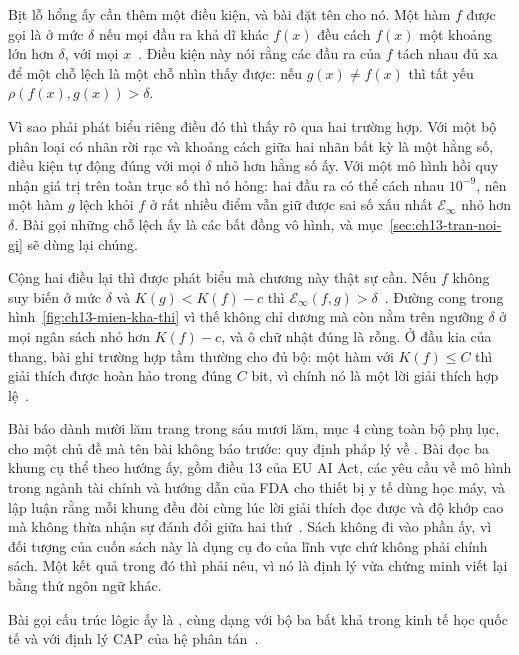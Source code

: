 %
Bịt lỗ hổng ấy cần thêm một điều kiện, và bài đặt tên cho nó. Một hàm $f$ được
gọi là  ở mức $\delta$ nếu mọi đầu ra khả dĩ
khác $f(x)$ đều cách $f(x)$ một khoảng lớn hơn $\delta$, với mọi
$x$~\autocite{p26limits}. Điều kiện này nói rằng các đầu ra của $f$ tách nhau đủ
xa để một chỗ lệch là một chỗ nhìn thấy được: nếu $g(x) \ne f(x)$ thì tất yếu
$\rho(f(x),g(x)) > \delta$.

Vì sao phải phát biểu riêng điều đó thì thấy rõ qua hai trường hợp. Với một bộ
phân loại có nhãn rời rạc và khoảng cách giữa hai nhãn bất kỳ là một hằng số,
điều kiện tự động đúng với mọi $\delta$ nhỏ hơn hằng số ấy. Với một mô hình hồi
quy nhận giá trị trên toàn trục số thì nó hỏng: hai đầu ra có thể cách nhau
$10^{-9}$, nên một hàm $g$ lệch khỏi $f$ ở rất nhiều điểm vẫn giữ được sai số
xấu nhất $\mathcal{E}_{\infty}$ nhỏ hơn $\delta$. Bài gọi những chỗ lệch ấy là các bất đồng vô hình,
và mục~\ref{sec:ch13-tran-noi-gi} sẽ dùng lại chúng.

Cộng hai điều lại thì được phát biểu mà chương này thật sự cần. Nếu $f$ không
suy biến ở mức $\delta$ và $K(g) < K(f) - c$ thì
$\mathcal{E}_{\infty}(f,g) > \delta$~\autocite{p26limits}. Đường cong trong
hình~\ref{fig:ch13-mien-kha-thi} vì thế không chỉ dương mà còn nằm trên ngưỡng
$\delta$ ở mọi ngân sách nhỏ hơn $K(f) - c$, và ô chữ nhật đúng là rỗng. Ở đầu
kia của thang, bài ghi trường hợp tầm thường cho đủ bộ: một hàm với
$K(f) \le C$ thì giải thích được hoàn hảo trong đúng $C$ bit, vì chính nó là một
lời giải thích hợp lệ~\autocite{p26limits}.

%
Bài báo dành mười lăm trang trong sáu mươi lăm, mục 4 cùng toàn bộ phụ lục, cho một chủ
đề mà tên bài không báo trước: quy định pháp lý về . Bài đọc
ba khung cụ thể theo hướng ấy, gồm điều 13 của EU AI Act, các yêu cầu về mô hình
trong ngành tài chính và hướng dẫn của FDA cho thiết bị y tế dùng học máy, và
lập luận rằng mỗi khung đều đòi cùng lúc lời giải thích đọc được và độ khớp cao
mà không thừa nhận sự đánh đổi giữa hai thứ~\autocite{p26limits}. Sách không đi
vào phần ấy, vì đối tượng của cuốn sách này là dụng cụ đo của lĩnh vực chứ không
phải chính sách. Một kết quả trong đó thì phải nêu, vì nó là định lý vừa chứng
minh viết lại bằng thứ ngôn ngữ khác.

Bài gọi cấu trúc lôgic ấy là , cùng dạng với bộ ba
bất khả trong kinh tế học quốc tế và với định lý CAP của hệ phân
tán~\autocite{p26limits}.

